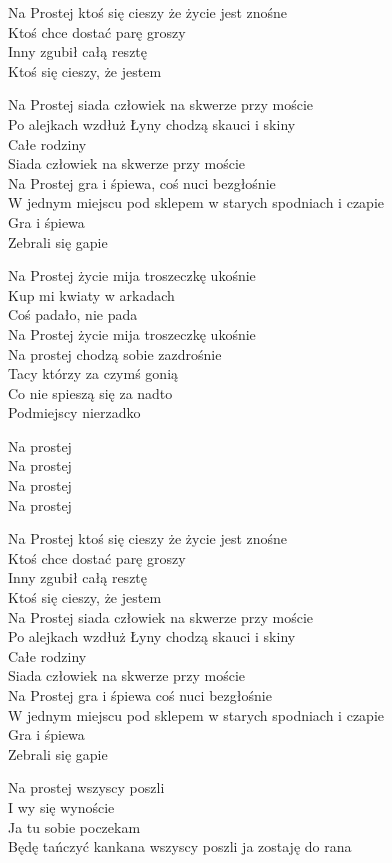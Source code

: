 \begin{text}
    Na Prostej ktoś się cieszy że życie jest znośne\\
    Ktoś chce dostać parę groszy\\
    Inny zgubił całą resztę\\
    Ktoś się cieszy, że jestem

    Na Prostej siada człowiek na skwerze przy moście\\
    Po alejkach wzdłuż Łyny chodzą skauci i skiny\\
    Całe rodziny\\
    Siada człowiek na skwerze przy moście\\
    Na Prostej gra i śpiewa, coś nuci bezgłośnie\\
    W jednym miejscu pod sklepem w starych spodniach i czapie\\
    Gra i śpiewa\\
    Zebrali się gapie

    Na Prostej życie mija troszeczkę ukośnie\\
    Kup mi kwiaty w arkadach\\
    Coś padało, nie pada\\
    Na Prostej życie mija troszeczkę ukośnie\\
    Na prostej chodzą sobie zazdrośnie\\
    Tacy którzy za czymś gonią\\
    Co nie spieszą się za nadto\\
    Podmiejscy nierzadko

    Na prostej\\
    Na prostej\\
    Na prostej\\
    Na prostej

    Na Prostej ktoś się cieszy że życie jest znośne\\
    Ktoś chce dostać parę groszy\\
    Inny zgubił całą resztę\\
    Ktoś się cieszy, że jestem\\
    Na Prostej siada człowiek na skwerze przy moście\\
    Po alejkach wzdłuż Łyny chodzą skauci i skiny\\
    Całe rodziny\\
    Siada człowiek na skwerze przy moście\\
    Na Prostej gra i śpiewa coś nuci bezgłośnie\\
    W jednym miejscu pod sklepem w starych spodniach i czapie\\
    Gra i śpiewa\\
    Zebrali się gapie

    Na prostej wszyscy poszli\\
    I wy się wynoście\\
    Ja tu sobie poczekam\\
    Będę tańczyć kankana wszyscy poszli ja zostaję do rana
\end{text}
\begin{chord}

\end{chord}